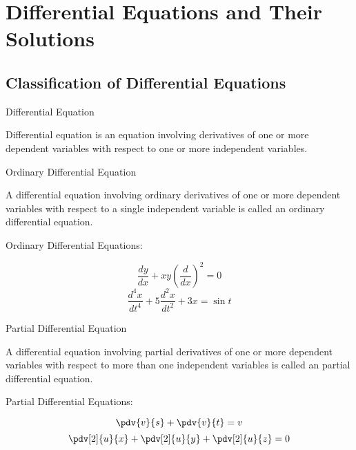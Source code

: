 
\section{Differential Equations and Their Solutions}


\subsection{Classification of Differential Equations}

\begin{definition}{Differential Equation}
    
    Differential equation is an equation involving derivatives of one or more dependent variables with respect to one or more independent variables.
\end{definition}

\begin{definition}{Ordinary Differential Equation}
    
    A differential equation involving ordinary derivatives of one or more dependent variables with respect to a single independent variable is called an ordinary differential equation.
\end{definition}
\begin{example}{Ordinary Differential Equations:}
    
    \begin{equation}
        \frac{dy}{dx} + xy \left( \frac{d}{dx} \right)^2 = 0
    \end{equation}
    \begin{equation}
        \frac{d^4 x}{dt^4} + 5 \frac{d^2 x}{dt^2} + 3x = \sin{t}
    \end{equation}
\end{example}

\begin{definition}{Partial Differential Equation}
    
    A differential equation involving partial derivatives of one or more dependent variables with respect to more than one independent variables is called an partial differential equation.
\end{definition}
\begin{example}{Partial Differential Equations:}
    
    \begin{equation}
        \pdv{v}{s} + \pdv{v}{t} = v
    \end{equation}
    \begin{equation}
        \pdv[2]{u}{x} + \pdv[2]{u}{y} + \pdv[2]{u}{z} = 0
    \end{equation}
\end{example}

